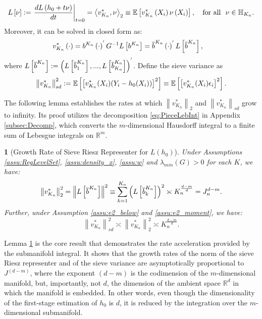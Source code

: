 \documentclass[12pt,american]{article}
\theoremstyle{definition}
\theoremstyle{plain}
\theoremstyle{definition}
\theoremstyle{plain}
\newtheorem{lem}{\protect\lemmaname}
\theoremstyle{plain}
\theoremstyle{plain}
\theoremstyle{plain}
\theoremstyle{plain}
\newcommand{\R}{\mathbb{R}}
\newcommand{\E}{\mathbb{E}}
\newcommand{\norm}[1]{\left\| #1 \right\|}
\providecommand{\lemmaname}{Lemma}
\providecommand{\lemmaname}{Lemma}
\begin{document}
\begin{equation}\label{eq:sieve_riesz}
  L\left[\nu\right]:=\rest{\frac{dL\left(h_0 +t\nu\right)}{dt}}_{t=0}=\inprod{v_{K_n}^{*},\nu}_2\equiv\E\left[v_{K_{n}}^{*}\left(X_{i}\right)\nu\left(X_{i}\right)\right],~~\text{ for all }~\nu\in {\H}_{K_n}.
\end{equation}
Moreover, it can be solved in closed form as:
\begin{align}
  v_{K_{n}}^{*}\left(\cdot\right) & = b^{K_{n}}\left(\cdot\right)^{'}G^{-1}L\left[ b^{K_{n}}\right]=\overline{b}^{K_{n}}\left(\cdot\right)^{'}L\left[\overline{b}^{K_{n}}\right],\label{Sieve-Riesz}
\end{align}
where $L\left[\overline{b}^{K_{n}}\right]:=\left(L\left[\overline{b}_1^{K_{n}}\right],..., L\left[\overline{b}_{K_n}^{K_{n}}\right]\right)^{'}$. Define the sieve variance as
\begin{equation}
  \norm{v^*_{K_n}}_{sd}^2:=\E\left[\left[ v^*_{K_n}(X_i)(Y_i-h_0(X_i))\right]^2\right]\equiv \E\left[\left[ v^*_{K_n}(X_i)\e_i\right]^2\right].\label{Sieve-sd}
\end{equation}

The following lemma establishes the rates at which $\norm{v_{K_{n}}^{*}}_{2}$ and $\norm{v_{K_{n}}^{*}}_{sd}$ grow to infinity. Its proof utilizes the decomposition \eqref{eq:PieceLebInt}  in Appendix \ref{subsec:Decomp}, which converts the $m$-dimensional Hausdorff integral to a finite sum of Lebesgue integrals on $\R^{m}$.

\begin{lem}[Growth Rate of Sieve Riesz Representer for $L(h_0)$]
  \label{lem:NormRate_d-m}Under Assumptions \ref{assu:RegLevelSet}, \ref{assu:density_x}, \ref{assu:w} and $\lambda_{min} (G) >0$ for each $K$, we have:
  \begin{equation}
    \norm{v_{K_{n}}^{*}}_{2}^{2}=\norm{L\left[\ol b^{K_{n}}\right]}^{2}\equiv\sum_{k=1}^{K_{n}}\left(L\left[\ol b_{k}^{K_{n}}\right]\right)^2\asymp K_{n}^{\frac{d-m}{d}}=J_{n}^{d-m}.\label{eq:NormRate}
  \end{equation}
  Further, under Assumption \ref{assu:e2_below} and \ref{assu:e2_moment}, we have:
  \[
    \norm{v^*_{K_n}}_{sd}^2\asymp\norm{v_{K_{n}}^{*}}_{2}^{2}\asymp K_{n}^{\frac{d-m}{d}}.
  \]
\end{lem}

\noindent Lemma \ref{lem:NormRate_d-m} is the core result that demonstrates the rate acceleration provided by
the submanifold integral. It shows that the growth rates of the norm
of the sieve Riesz representer and of the sieve variance are asymptotically proportional to $J^{(d-m)}$,
where the exponent $(d-m)$ is the codimension of the $m$-dimensional
manifold, but, importantly, not $d$, the dimension of the ambient
space $\R^{d}$ in which the manifold is embedded. In other words,
even though the dimensionality of the first-stage estimation
of $h_{0}$ is $d$, it is reduced by the integration over the $m$-dimensional
submanifold.
\end{document}
